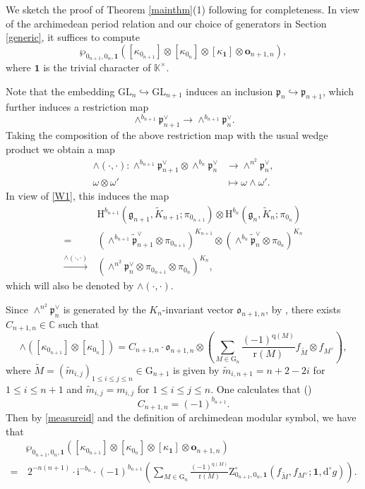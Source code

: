 \documentclass[12pt, a4paper]{amsart}
\newcommand{\RG}{{\mathrm {G}}}
\newcommand{\RH}{{\mathrm {H}}}
\newcommand{\RZ}{{\mathrm {Z}}}
\newcommand{\GL}{{\mathrm{GL}}}
\newcommand{\C}{\mathbb{C}}
\newcommand{\K}{\mathbb{K}}
\theoremstyle{Theorem}
\theoremstyle{Theorem}
\theoremstyle{Theorem}
\theoremstyle{Theorem}
\theoremstyle{Plain}
\theoremstyle{Definition}
\begin{document}
	We sketch the proof of Theorem \ref{mainthm}(1) following \cite{HMN} for completeness. In view of the archimedean period relation \cite[Theorem 1.6]{JLSa} and our choice of generators in Section \ref{generic}, it suffices to compute
	\[
	\wp_{0_{n+1},0_n,\mathbf{1}}\left([\kappa_{0_{n+1}}]\otimes[\kappa_{0_n}]\otimes[\kappa_{\mathbf{1}}]\otimes\mathbf{o}_{n+1,n}\right),
	\]
	where $\mathbf{1}$ is the trivial character of $\K^{\times}$.
	
	Note that the embedding $\GL_n\hookrightarrow\GL_{n+1}$ induces an inclusion $\mathfrak{p}_n\hookrightarrow\mathfrak{p}_{n+1}$, which further induces a restriction map
	\[
	\wedge^{b_{n+1}}\mathfrak{p}_{n+1}^{\vee}\to\wedge^{b_{n+1}}\mathfrak{p}_{n}^{\vee}.
	\]
	Taking the composition of the above restriction map with the usual wedge product we obtain a map
	\[
	\begin{aligned}
		\wedge(\cdot,\cdot):\wedge^{b_{n+1}}\mathfrak{p}_{n+1}^{\vee}\otimes\wedge^{b_n}\mathfrak{p}_n^{\vee}&\to\wedge^{n^2}\mathfrak{p}_n^{\vee},\\
		\omega\otimes\omega'&\mapsto\omega\wedge\omega'.
	\end{aligned}
	\]
	In view of \eqref{W1}, this induces the map
	\[
	\begin{aligned}	&\,\RH^{b_{n+1}}(\mathfrak{g}_{n+1},\widetilde{K}_{n+1};\pi_{0_{n+1}})\otimes\RH^{b_{n}}(\mathfrak{g}_{n},\widetilde{K}_{n};\pi_{0_{n}})\\
		=&\,\left(\wedge^{b_{n+1}}\widetilde{\mathfrak{p}}_{n+1}^{\vee}\otimes\pi_{0_{n+1}}\right)^{K_{n+1}}\otimes\left(\wedge^{b_{n}}\widetilde{\mathfrak{p}}_{n}^{\vee}\otimes\pi_{0_{n}}\right)^{K_{n}}\\
		\xrightarrow{\wedge(\cdot,\cdot)}&\,\left(\wedge^{n^2}\mathfrak{p}_n^{\vee}\otimes\pi_{0_{n+1}}\otimes\pi_{0_n}\right)^{K_n},
	\end{aligned}
	\]
	which will also be denoted by $\wedge(\cdot,\cdot)$. 
	
	Since $\wedge^{n^2}\mathfrak{p}_n^{\vee}$ is generated by the $K_n$-invariant vector $\mathfrak{o}_{n+1,n}$, by \cite[Lemma 4.2]{IM}, there exists $C_{n+1,n}\in\C$ such that
	\[
	\wedge([\kappa_{0_{n+1}}]\otimes[\kappa_{0_n}])=C_{n+1,n}\cdot\mathfrak{o}_{n+1,n}\otimes\left(\sum_{M\in\RG_n}\frac{(-1)^{\mathrm{q}(M)}}{\mathrm{r}(M)}f_{\widetilde{M}}\otimes f_{M^{\vee}}\right),
	\]
	where $\widetilde{M}=(\widetilde{m}_{i,j})_{1\leq i\leq j\leq n}\in\RG_{n+1}$ is given by $\widetilde{m}_{i,n+1}=n+2-2i$ for $1\leq i\leq n+1$ and $\widetilde{m}_{i,j}=m_{i,j}$ for $1\leq i\leq j\leq n$. One calculates that (\cite[Proposition 2.18]{HMN}) 
	\[
	C_{n+1,n}=(-1)^{b_{n+1}}.
	\]
	Then by \eqref{measureid} and the definition of archimedean modular symbol, we have that
	\[
	\begin{aligned}
		&\wp_{0_{n+1},0_n,\mathbf{1}}\left([\kappa_{0_{n+1}}]\otimes[\kappa_{0_n}]\otimes[\kappa_{\mathbf{1}}]\otimes\mathbf{o}_{n+1,n}\right)\\
		=&\,2^{-n(n+1)}\cdot\mathrm{i}^{-b_n}\cdot(-1)^{b_{n+1}}\left(\sum_{M\in\RG_n}\frac{(-1)^{\mathrm{q}(M)}}{\mathrm{r}(M)}\RZ^{\circ}_{0_{n+1},0_n,\mathbf{1}}\left(f_{\widetilde{M}},f_{M^{\vee}};\mathbf{1},\mathrm{d}^{\circ}g\right)\right).
	\end{aligned}
	\]
	
\end{document}
